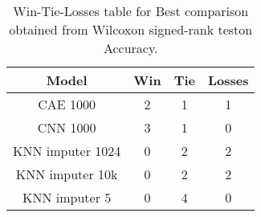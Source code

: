 \begin{table}[H]
\centering
\begin{tabular}{|c|c|c|c|}

   \textbf{Model} &  \textbf{Win} &  \textbf{Tie} &  \textbf{Losses} \\
\hline

         CAE 1000 &             2 &             1 &                1 \\
\hline
         CNN 1000 &             3 &             1 &                0 \\
\hline
 KNN imputer 1024 &             0 &             2 &                2 \\
\hline
  KNN imputer 10k &             0 &             2 &                2 \\
\hline
    KNN imputer 5 &             0 &             4 &                0 \\
\hline

\end{tabular}
\caption{Win-Tie-Losses table for Best comparison obtained from Wilcoxon signed-rank teston Accuracy.}
\label{tab:best_comparison_knn_vs_cae_vs_cnn}
\end{table}